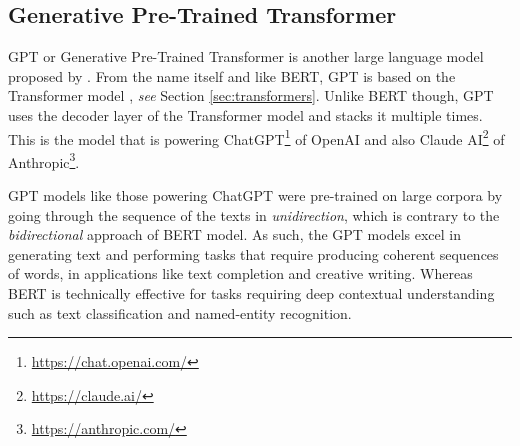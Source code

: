 \subsection{Generative Pre-Trained Transformer}
GPT or Generative Pre-Trained Transformer is another large language model proposed by . From the name itself and like BERT, GPT is based on the Transformer model \cite{vaswani2017attention}, \textit{see} Section \ref{sec:transformers}. Unlike BERT though, GPT uses the decoder layer of the Transformer model and stacks it multiple times. This is the model that is powering ChatGPT\footnote{\url{https://chat.openai.com/}} of OpenAI and also Claude AI\footnote{\url{https://claude.ai/}} of Anthropic\footnote{\url{https://anthropic.com/}}.

GPT models like those powering ChatGPT were pre-trained on large corpora by going through the sequence of the texts in \textit{unidirection}, which is contrary to the \textit{bidirectional} approach of BERT model. As such, the GPT models excel in generating text and performing tasks that require producing coherent sequences of words, in applications like text completion and creative writing. Whereas BERT is technically effective for tasks requiring deep contextual understanding such as text classification and named-entity recognition.